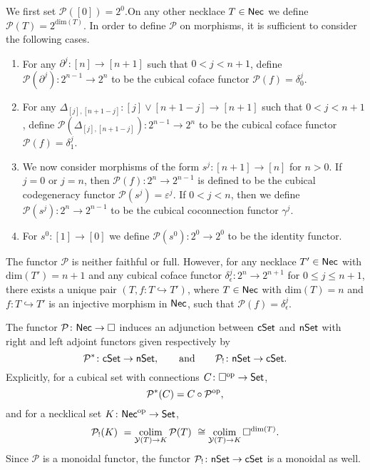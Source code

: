 We first set $\mathcal{P}([0])=2^0$.On any other necklace $T \in \mathsf{Nec}$ we define $\mathcal{P}( T )= 2^{\text{dim}(T)}$.
In order to define $\mathcal{P}$ on morphisms, it is sufficient to consider the following cases.
\begin{enumerate}
	\item For any $\partial^j \colon [n] \to [n+1]$ such that $0< j<{n+1}$, define $\mathcal{P}(\partial^j) \colon 2^{n-1}\to 2^{n}$ to be the cubical coface functor $\mathcal{P}(f)= \delta_0^{j}.$ 
	
	\item For any $\Delta_{[j], [n+1-j]} \colon [j] \vee [n+1-j] \to [n+1]$ such that $0<j<n+1$, define $\mathcal{P}(\Delta_{[j], [n+1-j]}) \colon 2^{n-1}\to 2^{n}$ to be the cubical coface functor $\mathcal{P}(f)=\delta_1^{j}$.
	
	\item We now consider morphisms of the form $s^j \colon [n+1] \to [n]$ for $n>0$.
	If $j=0$ or $j=n$, then $\mathcal{P}(f) \colon 2^n \to 2^{n-1}$ is defined to be the cubical codegeneracy functor $\mathcal{P}(s^j)= \varepsilon^{j}.$ If $0<j<n$, then we define $\mathcal{P}(s^j) \colon 2^n \to 2^{n-1}$ to be the cubical coconnection functor $\gamma^{j}.$
	
	\item For $s^0 \colon [1] \to [0]$ we define $\mathcal{P}(s^0) \colon 2^0 \to 2^0$ to be the identity functor.
\end{enumerate}

\begin{remark}
The functor $\mathcal{P}$ is neither faithful or full.
However, for any necklace $T' \in \mathsf{Nec}$ with $\text{dim}(T')=n+1$ and any cubical coface functor $\delta_{\epsilon}^j \colon 2^n \to 2^{n+1}$ for $0 \leq j \leq n+1$, there exists a unique pair $(T, f \colon T \hookrightarrow T')$, where $T \in \mathsf{Nec}$ with $\text{dim}(T)=n$ and $f \colon T \hookrightarrow T'$ is an injective morphism in $\mathsf{Nec}$, such that $\mathcal{P}(f)=\delta_{\epsilon}^j $.
\end{remark}

The functor $\mathcal{P} \colon \mathsf{Nec} \to \square$ induces an adjunction between $\mathsf{cSet}$ and $\mathsf{nSet}$ with right and left adjoint functors given respectively by
\begin{equation*}
\mathcal{P}^* \colon \mathsf{cSet} \to \mathsf{nSet},
\qquad \text{and} \qquad
\mathcal{P}_{!}  \colon \mathsf{nSet} \to \mathsf{cSet}.
\end{equation*}
Explicitly, for a cubical set with connections $C \colon \square^{\mathrm{op}} \to \mathsf{Set}$, \begin{equation*}
\mathcal{P}^*(C)= C \circ \mathcal{P}^{\mathrm{op}},
\end{equation*}
and for a necklical set $K \colon \mathsf{Nec}^{\mathrm{op}} \to \mathsf{Set}$,
\begin{equation*}
\mathcal{P}_{!}(K) \ =
\operatorname*{colim}_{\mathcal{Y}(T) \to K} \mathcal{P}(T) \ \cong 
\operatorname*{colim}_{\mathcal{Y}(T) \to K} \square^{\text{dim}(T)}.
\end{equation*}
Since $\mathcal{P}$ is a monoidal functor, the functor $\mathcal{P}_{!} \colon \mathsf{nSet} \to \mathsf{cSet}$ is a monoidal as well.

